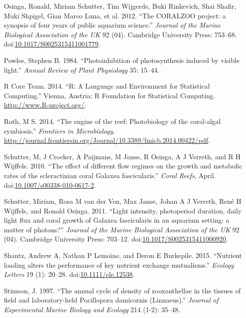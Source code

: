 \documentclass[]{elsarticle} %
\begin{document}
\hypertarget{ref-Osinga:2012is}{}
Osinga, Ronald, Miriam Schutter, Tim Wijgerde, Buki Rinkevich, Shai
Shafir, Muki Shpigel, Gian Marco Luna, et al. 2012. ``The CORALZOO
project: a synopsis of four years of public aquarium science.''
\emph{Journal of the Marine Biological Association of the UK} 92 (04).
Cambridge University Press: 753--68.
doi:\href{https://doi.org/10.1017/S0025315411001779}{10.1017/S0025315411001779}.

\hypertarget{ref-Powles:1984tm}{}
Powles, Stephen B. 1984. ``Photoinhibition of photosynthesis induced by
visible light.'' \emph{Annual Review of Plant Physiology} 35: 15--44.

\hypertarget{ref-RALanguageandEn:2014wf}{}
R Core Team. 2014. ``R: A Language and Environment for Statistical
Computing.'' Vienna, Austria: R Foundation for Statistical Computing.
\url{http://www.R-project.org/}.

\hypertarget{ref-Roth:2014wf}{}
Roth, M S. 2014. ``The engine of the reef: Photobiology of the
coral-algal symbiosis.'' \emph{Frontiers in Microbiology}.
\url{http://journal.frontiersin.org/Journal/10.3389/fmicb.2014.00422/pdf}.

\hypertarget{ref-Schutter:2010p7758}{}
Schutter, M, J Crocker, A Paijmans, M Janse, R Osinga, A J Verreth, and
R H Wijffels. 2010. ``The effect of different flow regimes on the growth
and metabolic rates of the scleractinian coral Galaxea fascicularis.''
\emph{Coral Reefs}, April.
doi:\href{https://doi.org/10.1007/s00338-010-0617-2}{10.1007/s00338-010-0617-2}.

\hypertarget{ref-Schutter:2011ie}{}
Schutter, Miriam, Rosa M van der Ven, Max Janse, Johan A J Verreth, René
H Wijffels, and Ronald Osinga. 2011. ``Light intensity, photoperiod
duration, daily light flux and coral growth of Galaxea fascicularis in
an aquarium setting: a matter of photons?'' \emph{Journal of the Marine
Biological Association of the UK} 92 (04). Cambridge University Press:
703--12.
doi:\href{https://doi.org/10.1017/S0025315411000920}{10.1017/S0025315411000920}.

\hypertarget{ref-Shantz:2015dz}{}
Shantz, Andrew A, Nathan P Lemoine, and Deron E Burkepile. 2015.
``Nutrient loading alters the performance of key nutrient exchange
mutualisms.'' \emph{Ecology Letters} 19 (1): 20--28.
doi:\href{https://doi.org/10.1111/ele.12538}{10.1111/ele.12538}.

\hypertarget{ref-Stimson:1997p3837}{}
Stimson, J. 1997. ``The annual cycle of density of zooxanthellae in the
tissues of field and laboratory-held Pocillopora damicornis
(Linnaeus).'' \emph{Journal of Experimental Marine Biology and Ecology}
214 (1-2): 35--48.
\end{document}
